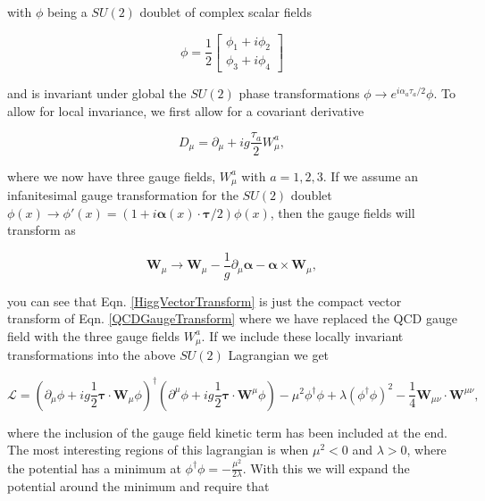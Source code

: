 with $\phi$ being a $SU(2)$ doublet of complex scalar fields

\begin{equation}
\phi=\frac{1}{2}
\begin{bmatrix}
\phi_1+i\phi_2 \\
\phi_3+i\phi_4
\end{bmatrix}
\end{equation} 

and is invariant under global the $SU(2)$ phase transformations $\phi\rightarrow e^{i\alpha_a\tau_a/2}\phi$. To allow for local invariance, we first allow for a covariant derivative

\begin{equation}
D_\mu=\partial_\mu+ig\frac{\tau_a}{2}W_\mu^a,
\end{equation}

where we now have three gauge fields, $W_\mu^a$ with $a=1,2,3$. If we assume an infanitesimal gauge transformation for the $SU(2)$ doublet $\phi(x)\rightarrow\phi'(x)=(1 +i\boldsymbol{\alpha}(x)\cdot\boldsymbol{\tau}/2)\phi(x)$, then the gauge fields will transform as

\begin{equation}\label{HiggVectorTransform}
\boldsymbol{W}_\mu\rightarrow\boldsymbol{W}_\mu-\frac{1}{g}\partial_\mu\boldsymbol{\alpha}-\boldsymbol{\alpha}\times\boldsymbol{W}_\mu,
\end{equation}

you can see that Eqn. \ref{HiggVectorTransform} is just the compact vector transform of Eqn. \ref{QCDGaugeTransform} where we have replaced the QCD gauge field with the three gauge fields $W_\mu^a$. If we include these locally invariant transformations into the above $SU(2)$ Lagrangian we get

\begin{equation}\label{HiggsInvariantL}
\mathcal{L}=(\partial_\mu\phi+ig\frac{1}{2}\boldsymbol{\tau}\cdot\boldsymbol{W}_\mu\phi)^\dagger(\partial^\mu\phi+ig\frac{1}{2}\boldsymbol{\tau}\cdot\boldsymbol{W}^\mu\phi)-\mu^2\phi^\dagger\phi+\lambda(\phi^\dagger\phi)^2-\frac{1}{4}\boldsymbol{W}_{\mu\nu}\cdot\boldsymbol{W}^{\mu\nu},
\end{equation}

where the inclusion of the gauge field kinetic term has been included at the end. The most interesting regions of this lagrangian is when $\mu^2<0$ and $\lambda>0$, where the potential has a minimum at $\phi^\dagger\phi=-\frac{\mu^2}{2\lambda}$. With this we will expand the potential around the minimum and require that

